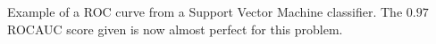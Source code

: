 Example of a ROC curve from a Support Vector Machine classifier. The $0.97$ ROCAUC score given is now almost perfect for this problem.